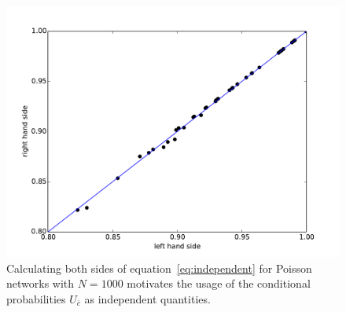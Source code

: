 \documentclass[aps, pre, onecolumn, a4paper, floatfix]{revtex4}
\begin{document}
\begin{figure}[htb]
\begin{center}
	\includegraphics[width=0.6\columnwidth]{finder_C_correlated.pdf}
	\caption{Calculating both sides of equation~\ref{eq:independent} for Poisson networks with $N=1000$ 
	motivates the usage of the conditional probabilities $U_{\bar c}$ as independent quantities.}
	\label{fig:corr}
\end{center}
\end{figure}
\end{document}
